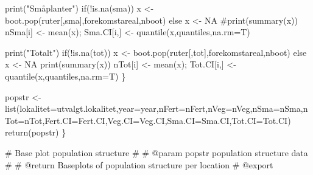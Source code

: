 \documentclass[
  letterpaper,
  DIV=11,
  numbers=noendperiod]{scrreport}
\newenvironment{Shaded}{\begin{snugshade}}{\end{snugshade}}
\newcommand{\AttributeTok}[1]{\textcolor[rgb]{0.40,0.45,0.13}{#1}}
\newcommand{\CommentTok}[1]{\textcolor[rgb]{0.37,0.37,0.37}{#1}}
\newcommand{\ConstantTok}[1]{\textcolor[rgb]{0.56,0.35,0.01}{#1}}
\newcommand{\ControlFlowTok}[1]{\textcolor[rgb]{0.00,0.23,0.31}{#1}}
\newcommand{\FunctionTok}[1]{\textcolor[rgb]{0.28,0.35,0.67}{#1}}
\newcommand{\NormalTok}[1]{\textcolor[rgb]{0.00,0.23,0.31}{#1}}
\newcommand{\OtherTok}[1]{\textcolor[rgb]{0.00,0.23,0.31}{#1}}
\newcommand{\SpecialCharTok}[1]{\textcolor[rgb]{0.37,0.37,0.37}{#1}}
\newcommand{\StringTok}[1]{\textcolor[rgb]{0.13,0.47,0.30}{#1}}
\begin{document}
\begin{Shaded}
\begin{Highlighting}[]
    \FunctionTok{print}\NormalTok{(}\StringTok{"Småplanter"}\NormalTok{)}
    \ControlFlowTok{if}\NormalTok{(}\SpecialCharTok{!}\FunctionTok{is.na}\NormalTok{(sma)) x }\OtherTok{\textless{}{-}} \FunctionTok{boot.pop}\NormalTok{(ruter[,sma],forekomstareal,nboot)}
    \ControlFlowTok{else}\NormalTok{ x }\OtherTok{\textless{}{-}} \ConstantTok{NA}
    \CommentTok{\#print(summary(x))}
\NormalTok{    nSma[i] }\OtherTok{\textless{}{-}} \FunctionTok{mean}\NormalTok{(x); Sma.CI[i,] }\OtherTok{\textless{}{-}} \FunctionTok{quantile}\NormalTok{(x,quantiles,}\AttributeTok{na.rm=}\NormalTok{T)}

    \FunctionTok{print}\NormalTok{(}\StringTok{"Totalt"}\NormalTok{)}
    \ControlFlowTok{if}\NormalTok{(}\SpecialCharTok{!}\FunctionTok{is.na}\NormalTok{(tot)) x }\OtherTok{\textless{}{-}} \FunctionTok{boot.pop}\NormalTok{(ruter[,tot],forekomstareal,nboot)}
    \ControlFlowTok{else}\NormalTok{ x }\OtherTok{\textless{}{-}} \ConstantTok{NA}
    \FunctionTok{print}\NormalTok{(}\FunctionTok{summary}\NormalTok{(x))}
\NormalTok{    nTot[i] }\OtherTok{\textless{}{-}} \FunctionTok{mean}\NormalTok{(x); Tot.CI[i,] }\OtherTok{\textless{}{-}} \FunctionTok{quantile}\NormalTok{(x,quantiles,}\AttributeTok{na.rm=}\NormalTok{T)}
\NormalTok{  \}}
  
\NormalTok{  popstr }\OtherTok{\textless{}{-}} \FunctionTok{list}\NormalTok{(}\AttributeTok{lokalitet=}\NormalTok{utvalgt.lokalitet,}\AttributeTok{year=}\NormalTok{year,}\AttributeTok{nFert=}\NormalTok{nFert,}\AttributeTok{nVeg=}\NormalTok{nVeg,}\AttributeTok{nSma=}\NormalTok{nSma,}\AttributeTok{nTot=}\NormalTok{nTot,}\AttributeTok{Fert.CI=}\NormalTok{Fert.CI,}\AttributeTok{Veg.CI=}\NormalTok{Veg.CI,}\AttributeTok{Sma.CI=}\NormalTok{Sma.CI,}\AttributeTok{Tot.CI=}\NormalTok{Tot.CI)}
  \FunctionTok{return}\NormalTok{(popstr)}
\NormalTok{\}}



\CommentTok{\#\textquotesingle{} Base plot population structure}
\CommentTok{\#\textquotesingle{}}
\CommentTok{\#\textquotesingle{} @param popstr population structure data }
\CommentTok{\#\textquotesingle{}}
\CommentTok{\#\textquotesingle{} @return Baseplots of population structure per location}
\CommentTok{\#\textquotesingle{} @export}


\end{Highlighting}
\end{Shaded}
\end{document}
